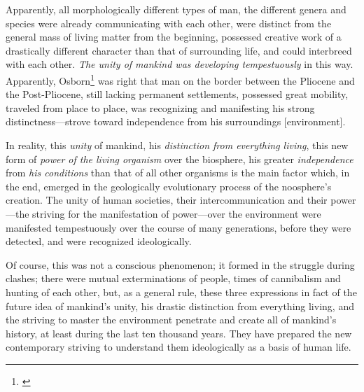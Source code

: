 Apparently, all morphologically different types of man, the different genera
and species were already communicating with each other, were distinct from the
general mass of living matter from the beginning, possessed creative work of a
drastically different character than that of surrounding life, and could
interbreed with each other.  \emph{The unity of mankind was developing
tempestuously} in this way.  Apparently, Osborn\footnote{\cite{osborn1910age}}
was right that man on the border between the Pliocene and the Post-Pliocene,
still lacking permanent settlements, possessed great mobility, traveled from
place to place, was recognizing and manifesting his strong
distinctness---strove toward independence from his surroundings [environment].


\Section %
In reality, this \emph{unity} of mankind, his \emph{distinction from everything
living}, this new form of \emph{power of the living organism} over the
biosphere, his greater \emph{independence} from \emph{his conditions} than that
of all other organisms is the main factor which, in the end, emerged in the
geologically evolutionary process of the noosphere's creation.  The unity of
human societies, their intercommunication and their power---the striving for
the manifestation of power---over the environment were manifested tempestuously
over the course of many generations, before they were detected, and were
recognized ideologically.

Of course, this was not a conscious phenomenon; it formed in the struggle
during clashes; there were mutual exterminations of people, times of
cannibalism and hunting of each other, but, as a general rule, these three
expressions in fact of the future idea of mankind's unity, his drastic
distinction from everything living, and the striving to master the environment
penetrate and create all of mankind's history, at least during the last ten
thousand years.  They have prepared the new contemporary striving to understand
them ideologically as a basis of human life.

